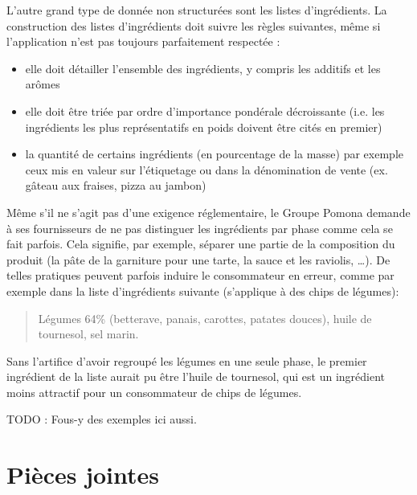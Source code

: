             L'autre grand type de donnée non structurées sont les listes d'ingrédients.
            La construction des listes d'ingrédients doit suivre les règles suivantes, même si l'application n'est pas toujours parfaitement respectée :
            \begin{itemize}
                \item elle doit détailler l'ensemble des ingrédients, y compris les additifs et les arômes
                \item elle doit être triée par ordre d'importance pondérale décroissante (i.e. les ingrédients les plus représentatifs en poids doivent être cités en premier)
                \item la quantité de certains ingrédients (en pourcentage de la masse) par exemple ceux mis en valeur sur l'étiquetage ou dans la dénomination de vente (ex. gâteau aux fraises, pizza au jambon)
            \end{itemize}
            Même s'il ne s'agit pas d'une exigence réglementaire, le Groupe Pomona demande à ses fournisseurs de ne pas distinguer les ingrédients par phase comme cela se fait parfois.
            Cela signifie, par exemple, séparer une partie de la composition du produit (la pâte de la garniture pour une tarte, la sauce et les raviolis, \dots).
            De telles pratiques peuvent parfois induire le consommateur en erreur, comme par exemple dans la liste d'ingrédients suivante (s'applique à des chips de légumes):
            \begin{quotation}
                Légumes 64\% (betterave, panais, carottes, patates douces), huile de tournesol, sel marin.
            \end{quotation}
            Sans l'artifice d'avoir regroupé les légumes en une seule phase, le premier ingrédient de la liste aurait pu être l'huile de tournesol, qui est un ingrédient moins attractif pour un consommateur de chips de légumes.


            TODO : Fous-y des exemples ici aussi.

        \section{Pièces jointes}
            \label{pieces_jointes}

